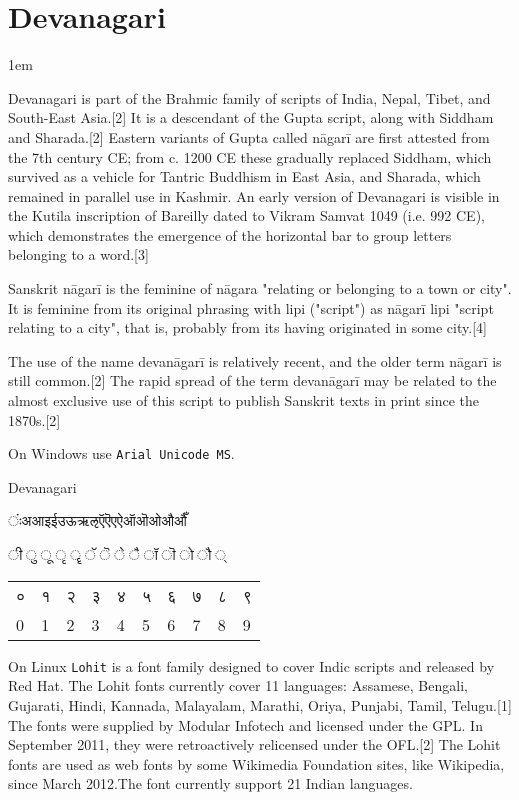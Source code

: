 \section{Devanagari}
\parindent1em

Devanagari is part of the Brahmic family of scripts of India, Nepal, Tibet, and South-East Asia.[2] It is a descendant of the Gupta script, along with Siddham and Sharada.[2] Eastern variants of Gupta called nāgarī are first attested from the 7th century CE; from c. 1200 CE these gradually replaced Siddham, which survived as a vehicle for Tantric Buddhism in East Asia, and Sharada, which remained in parallel use in Kashmir. An early version of Devanagari is visible in the Kutila inscription of Bareilly dated to Vikram Samvat 1049 (i.e. 992 CE), which demonstrates the emergence of the horizontal bar to group letters belonging to a word.[3]

Sanskrit nāgarī is the feminine of nāgara "relating or belonging to a town or city". It is feminine from its original phrasing with lipi ("script") as nāgarī lipi "script relating to a city", that is, probably from its having originated in some city.[4]

The use of the name devanāgarī is relatively recent, and the older term nāgarī is still common.[2] The rapid spread of the term devanāgarī may be related to the almost exclusive use of this script to publish Sanskrit texts in print since the 1870s.[2]

On Windows use \texttt{Arial Unicode MS}. 
\medskip

\newfontfamily{}

\begin{scriptexample}[]{Devanagari}
{\begin{center}\parindent0pt\devanagari

ंःअआइईउऊऋऌऍऎएऐऑऒओऔऔँ \par 

ी	ु	ू	ृ	ॄ	ॅ	ॆ	े	ै	ॉ	ॊ	ो	ौ	्	\par

\bigskip		
\begin{tabular}{lll lll lll l}
०	&१	&२	&३	&४	&५	&६	&७	&८	&९\\
0	&1	&2	&3	&4	&5	&6	&7	&8	&9\\
\end{tabular}
\end{center}	
}
\end{scriptexample}


On Linux \texttt{Lohit} is a font family designed to cover Indic scripts and released by Red Hat. The Lohit fonts currently cover 11 languages: Assamese, Bengali, Gujarati, Hindi, Kannada, Malayalam, Marathi, Oriya, Punjabi, Tamil, Telugu.[1] The fonts were supplied by Modular Infotech and licensed under the GPL. In September 2011, they were retroactively relicensed under the OFL.[2] The Lohit fonts are used as web fonts by some Wikimedia Foundation sites, like Wikipedia, since March 2012.The font currently support 21 Indian languages. 

